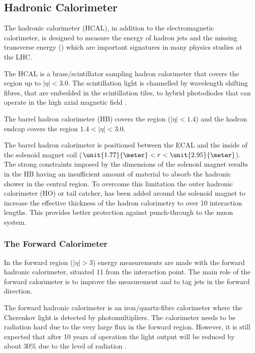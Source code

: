 \subsection{Hadronic Calorimeter}
The hadronic calorimeter (HCAL), in addition to the electromagnetic calorimeter,
is designed to measure the energy of hadron jets and the missing transverse
energy (\met) which are important signatures in many physics studies at the LHC.

The {HCAL} is a brass/scintillator
sampling hadron calorimeter that covers the region up to $|\eta|<3.0$.  The
scintillation light is channelled by wavelength shifting fibres, that are
embedded in the scintillation tiles, to hybrid photodiodes that can operate in
the high axial magnetic field \cite{chatrchyan2008cms}.

The barrel hadron calorimeter (HB) covers the region ($|\eta| < 1.4$)
and the hadron endcap covers the region $1.4 < |\eta| < 3.0$.

The barrel hadron calorimeter is positioned between the ECAL and the inside of
the solenoid magnet coil ($\unit{1.77}{\meter}<r<\unit{2.95}{\meter}$).  The
strong constraints imposed by the dimensions of the solenoid magnet results in
the HB having an insufficient amount of material to absorb the hadronic shower
in the central region.  To overcome this limitation the outer hadronic
calorimeter (HO) or tail catcher, has been added around the solenoid magnet to
increase the effective thickness of the hadron calorimetry to over 10
interaction lengths.  This provides better protection against punch-through to
the muon system.

\subsubsection{The Forward Calorimeter}
In the forward region ($|\eta| > 3$) energy measurements are made with the
forward hadronic calorimeter, situated \unit{11}{\meter} from the interaction
point. The main role of the forward calorimeter is to improve the \ETm
measurement and to tag jets in the forward direction.

The forward hadronic calorimeter is an iron/quartz-fibre calorimeter where the
Cherenkov light is detected by photomultipliers.  The calorimeter needs to be
radiation hard due to the very large flux in the forward region. However, it is
still expected that after 10 years of operation the light output will be reduced by
about $30\%$ due to the level of radiation \cite{chatrchyan2008cms}. 


